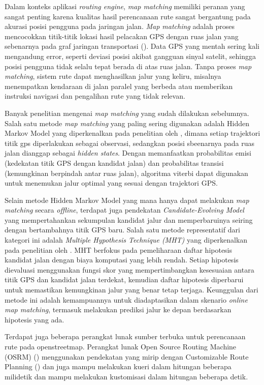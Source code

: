 Dalam konteks aplikasi \textit{routing engine}, \textit{map matching} memiliki peranan yang sangat penting karena kualitas hasil perencanaan rute sangat bergantung pada akurasi posisi pengguna pada jaringan jalan. \textit{Map matching} adalah proses mencocokkan titik-titik lokasi hasil pelacakan GPS dengan ruas jalan yang sebenarnya pada graf jaringan transportasi (\cite{Newson2009}). Data GPS yang mentah sering kali mengandung error, seperti deviasi posisi akibat gangguan sinyal satelit, sehingga posisi pengguna tidak selalu tepat berada di atas ruas jalan. Tanpa proses \textit{map matching}, sistem rute dapat menghasilkan jalur yang keliru, misalnya menempatkan kendaraan di jalan paralel yang berbeda atau memberikan instruksi navigasi dan pengalihan rute yang tidak relevan.


Banyak penelitian mengenai \textit{map matching} yang sudah dilakukan sebelumnya. Salah satu metode \textit{map matching} yang paling sering digunakan adalah Hidden Markov Model yang diperkenalkan pada penelitian oleh \cite{Newson2009}, dimana setiap trajektori titik gps diperlakukan sebagai observasi, sedangkan posisi sbeenarnya pada ruas jalan dianggap sebagai \textit{hidden states}. Dengan memanfaatkan probabilitas emisi (kedekatan titik GPS dengan kandidat jalan) dan probabilitas transisi (kemungkinan berpindah antar ruas jalan), algoritma viterbi dapat digunakan untuk menemukan jalur optimal yang sesuai dengan trajektori GPS.

Selain metode Hidden Markov Model yang mana hanya dapat melakukan \textit{map matching} secara \textit{offline}, terdapat juga pendekatan \textit{Candidate-Evolving Model} yang mempertahankan sekumpulan kandidat jalur dan memperbaruinya seiring dengan bertambahnya titik GPS baru. Salah satu metode representatif dari kategori ini adalah \textit{Multiple Hypothesis Technique (MHT)} yang diperkenalkan pada penelitian oleh \cite{Taguchi2019}. MHT berfokus pada pemeliharaan daftar hipotesis kandidat jalan dengan biaya komputasi yang lebih rendah. Setiap hipotesis dievaluasi menggunakan fungsi skor yang mempertimbangkan kesesuaian antara titik GPS dan kandidat jalan terdekat, kemudian daftar hipotesis diperbarui untuk memastikan kemungkinan jalur yang benar tetap terjaga. Keunggulan dari metode ini adalah kemampuannya untuk diadaptasikan dalam skenario \textit{online map matching}, termasuk melakukan prediksi jalur ke depan berdasarkan hipotesis yang ada. 

Terdapat juga beberapa perangkat lunak sumber terbuka untuk perencanaan rute pada openstreetmap. Perangkat lunak Open Source Routing Machine (OSRM)  (\cite{Luxen2011}) menggunakan pendekatan yang mirip dengan Customizable Route Planning (\cite{Delling2015}) dan juga mampu melakukan kueri dalam hitungan beberapa milidetik dan mampu melakukan kustomisasi dalam hitungan beberapa detik.



